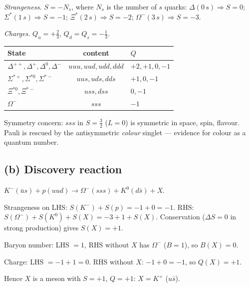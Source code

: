 \documentclass[11pt]{article}
\begin{document}
\textit{Strangeness.} $S=-N_s$, where $N_s$ is the number of $s$ quarks: $\Delta(0\,s)\Rightarrow S=0$; $\Sigma^*(1\,s)\Rightarrow S=-1$; $\Xi^*(2\,s)\Rightarrow S=-2$; $\Omega^-(3\,s)\Rightarrow S=-3$.

\textit{Charges.} $Q_u=+\tfrac23,\,Q_d=Q_s=-\tfrac13$.

\begin{center}
\begin{tabular}{lcl}
\toprule
State & content & $Q$ \\
\midrule
$\Delta^{++},\Delta^+,\Delta^0,\Delta^-$ & $uuu,uud,udd,ddd$ & $+2,+1,0,-1$ \\
$\Sigma^{*+},\Sigma^{*0},\Sigma^{*-}$ & $uus,uds,dds$ & $+1,0,-1$ \\
$\Xi^{*0},\Xi^{*-}$ & $uss,dss$ & $0,-1$ \\
$\Omega^-$ & $sss$ & $-1$ \\
\bottomrule
\end{tabular}
\end{center}

Symmetry concern: $sss$ in $S=\tfrac32$ ($L=0$) is symmetric in space, spin, flavour. Pauli is rescued by the antisymmetric \emph{colour} singlet — evidence for colour as a quantum number.

\subsection*{(b) Discovery reaction}

$K^-(\bar u s) + p(uud) \to \Omega^-(sss) + K^0(d\bar s) + X$.

Strangeness on LHS: $S(K^-)+S(p)=-1+0=-1$. RHS: $S(\Omega^-)+S(K^0)+S(X)=-3+1+S(X)$. Conservation ($\Delta S=0$ in strong production) gives $S(X)=+1$.

Baryon number: LHS $=1$, RHS without $X$ has $\Omega^-$ ($B=1$), so $B(X)=0$.

Charge: LHS $=-1+1=0$. RHS without $X$: $-1+0=-1$, so $Q(X)=+1$.

Hence $X$ is a meson with $S=+1$, $Q=+1$: $X=K^+$ ($u\bar s$).
\end{document}
